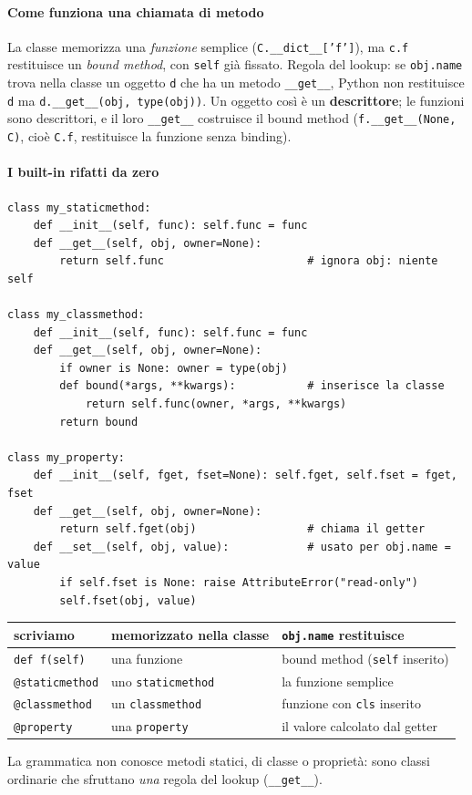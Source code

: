 \documentclass[a4paper,12pt]{article}
\begin{document}
\paragraph{Come funziona una chiamata di metodo} La classe memorizza una \emph{funzione}
semplice (\texttt{C.\_\_dict\_\_['f']}), ma \texttt{c.f} restituisce un \emph{bound method}, con
\texttt{self} già fissato. Regola del lookup: se \texttt{obj.name} trova nella classe un oggetto
\texttt{d} che ha un metodo \texttt{\_\_get\_\_}, Python non restituisce \texttt{d} ma
\texttt{d.\_\_get\_\_(obj, type(obj))}. Un oggetto così è un \textbf{descrittore}; le funzioni
sono descrittori, e il loro \texttt{\_\_get\_\_} costruisce il bound method
(\texttt{f.\_\_get\_\_(None, C)}, cioè \texttt{C.f}, restituisce la funzione senza binding).

\paragraph{I built-in rifatti da zero}
\begin{verbatim}
class my_staticmethod:
    def __init__(self, func): self.func = func
    def __get__(self, obj, owner=None):
        return self.func                      # ignora obj: niente self

class my_classmethod:
    def __init__(self, func): self.func = func
    def __get__(self, obj, owner=None):
        if owner is None: owner = type(obj)
        def bound(*args, **kwargs):           # inserisce la classe
            return self.func(owner, *args, **kwargs)
        return bound

class my_property:
    def __init__(self, fget, fset=None): self.fget, self.fset = fget, fset
    def __get__(self, obj, owner=None):
        return self.fget(obj)                 # chiama il getter
    def __set__(self, obj, value):            # usato per obj.name = value
        if self.fset is None: raise AttributeError("read-only")
        self.fset(obj, value)
\end{verbatim}
\begin{center}
\small
\begin{tabular}{|l|l|l|}
\hline
\textbf{scriviamo} & \textbf{memorizzato nella classe} & \textbf{\texttt{obj.name} restituisce} \\
\hline
\texttt{def f(self)} & una funzione & bound method (\texttt{self} inserito) \\
\texttt{@staticmethod} & uno \texttt{staticmethod} & la funzione semplice \\
\texttt{@classmethod} & un \texttt{classmethod} & funzione con \texttt{cls} inserito \\
\texttt{@property} & una \texttt{property} & il valore calcolato dal getter \\
\hline
\end{tabular}
\end{center}
La grammatica non conosce metodi statici, di classe o proprietà: sono classi ordinarie che
sfruttano \emph{una} regola del lookup (\texttt{\_\_get\_\_}).
\end{document}
